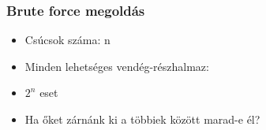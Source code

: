 \begin{frame}
\frametitle{Brute force megoldás}

\begin{itemize}
\item Csúcsok száma: n
\end{itemize}

\begin{itemize}
\item Minden lehetséges vendég-részhalmaz:
\item $2^n$ eset
\item Ha őket zárnánk ki a többiek között marad-e él?
\end{itemize}
\end{frame}

